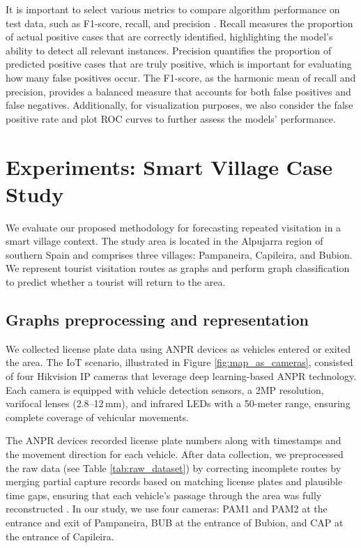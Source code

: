 \documentclass[journal]{IEEEtran}
\begin{document}
It is important to select various metrics to compare algorithm performance on test data, such as F1-score, recall, and precision \cite{naidu2023review}. Recall measures the proportion of actual positive cases that are correctly identified, highlighting the model’s ability to detect all relevant instances. Precision  quantifies the proportion of predicted positive cases that are truly positive, which is important for evaluating how many false positives occur. The F1-score, as the harmonic mean of recall and precision, provides a balanced measure that accounts for both false positives and false negatives. Additionally, for visualization purposes, we also consider the false positive rate and plot ROC curves to further assess the models' performance.




\section{Experiments: Smart Village Case Study} \label{sec:experiments}

We evaluate our proposed methodology for forecasting repeated visitation in a smart village context. The study area is located in the Alpujarra region of southern Spain and comprises three villages: Pampaneira, Capileira, and Bubion. We represent tourist visitation routes as graphs and perform graph classification to predict whether a tourist will return to the area. 


\subsection{Graphs preprocessing and representation} \label{sec:data_collection_preprocessing}


We collected license plate data using ANPR devices as vehicles entered or exited the area. The IoT scenario, illustrated in Figure \ref{fig:map_as_cameras}, consisted of four Hikvision IP cameras that leverage deep learning-based ANPR technology. Each camera is equipped with vehicle detection sensors, a 2MP resolution, varifocal lenses (2.8–12\,mm), and infrared LEDs with a 50-meter range, ensuring complete coverage of vehicular movements.



The ANPR devices recorded license plate numbers along with timestamps and the movement direction for each vehicle. After data collection, we preprocessed the raw data (see Table \ref{tab:raw_dataset}) by correcting incomplete routes by merging partial capture records based on matching license plates and plausible time gaps, ensuring that each vehicle’s passage through the area was fully reconstructed \cite{duran2024routerecoverer}. In our study, we use four cameras: PAM1 and PAM2 at the entrance and exit of Pampaneira, BUB at the entrance of Bubion, and CAP at the entrance of Capileira.
\end{document}
